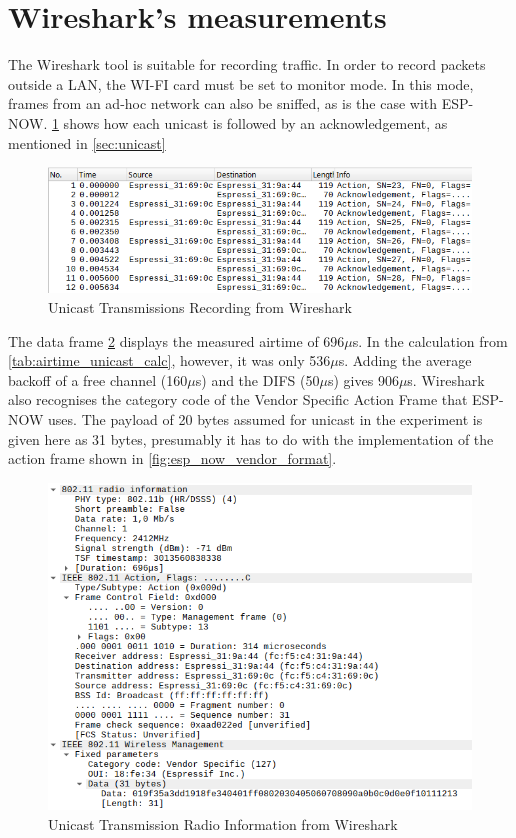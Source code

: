 \section{Wireshark's measurements}

The Wireshark tool is suitable for recording traffic.
In order to record packets outside a LAN, the WI-FI card must be set to monitor mode.
In this mode, frames from an ad-hoc network can also be sniffed, as is the case with ESP-NOW.
\cref{fig:wiresharkUC} shows how each unicast is followed by an acknowledgement, 
as mentioned in \cref{sec:unicast}

\begin{figure}[h]
	\centering
	\includegraphics[scale=0.5]{figures/wiresharkUC.pdf}
	\caption{Unicast Transmissions Recording from Wireshark}
	\label{fig:wiresharkUC}
\end{figure}

The data frame \cref{fig:wiresharkUCTransmission} displays the measured airtime of 696$\mu$s.
In the calculation from \cref{tab:airtime_unicast_calc}, however, it was only 536$\mu$s.
Adding the average backoff of a free channel (160$\mu$s) and the DIFS (50$\mu$s) gives 906$\mu$s.
Wireshark also recognises the category code of the Vendor Specific Action Frame that ESP-NOW uses.
The payload of 20 bytes assumed for unicast in the experiment is given here as 31 bytes,
presumably it has to do with the implementation of the action frame shown in \cref{fig:esp_now_vendor_format}.

\begin{figure}[h]
	\centering
	\includegraphics[scale=0.4]{figures/wiresharkUCFrame.png}
	\caption{Unicast Transmission Radio Information from Wireshark}
	\label{fig:wiresharkUCTransmission}
\end{figure}

